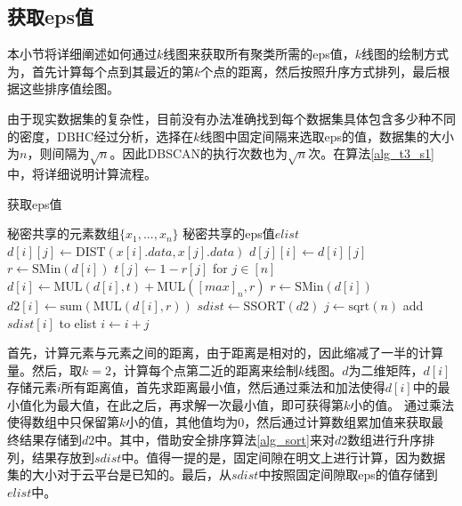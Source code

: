 \subsection{获取eps值}
本小节将详细阐述如何通过$ k $线图来获取所有聚类所需的eps值，$ k $线图的绘制方式为，首先计算每个点到其最近的第$ k $个点的距离，然后按照升序方式排列，最后根据这些排序值绘图。

由于现实数据集的复杂性，目前没有办法准确找到每个数据集具体包含多少种不同的密度，DBHC\cite{latifi2021dbhc}经过分析，选择在$ k $线图中固定间隔来选取eps的值，数据集的大小为$ n $，则间隔为$ \sqrt{n} $。因此DBSCAN的执行次数也为$ \sqrt{n} $次。在算法\ref{alg_t3_s1}中，将详细说明计算流程。

\begin{algorithm}[htbp]
	\renewcommand{\algorithmicrequire}{\textbf{输入:}}
	\renewcommand{\algorithmicensure}{\textbf{输出:}}
	\caption{获取eps值}
	\label{alg_t3_s1}
	\begin{algorithmic}[1]
		\REQUIRE 秘密共享的元素数组$ \{x_1,...,x_n\} $
		\ENSURE 秘密共享的eps值$ elist $
		\STATE $ d[i][j] \leftarrow \text{DIST}(x[i].data, x[j].data) $
		\STATE $ d[j][i] \leftarrow d[i][j] $
		\ENDFOR
		\ENDFOR
		\STATE $ r \leftarrow \text{SMin}(d[i]) $ %
		\STATE $ t[j] \leftarrow 1-r[j] $ for $ j\in[n] $
		\STATE $ d[i] \leftarrow \text{MUL}(d[i], t) + \text{MUL}([max]_n, r) $
		\STATE $ r \leftarrow \text{SMin}(d[i]) $
		\STATE $ d2[i] \leftarrow \text{sum}(\text{MUL}(d[i], r)) $ %
		\ENDFOR
		\STATE $ sdist \leftarrow \text{SSORT}(d2) $
		\STATE $ j \leftarrow \text{sqrt}(n) $
		\STATE add $ sdist[i] $ to elist
		\STATE $ i \leftarrow i + j $
		\ENDFOR
	\end{algorithmic}
\end{algorithm}

首先，计算元素与元素之间的距离，由于距离是相对的，因此缩减了一半的计算量。然后，取$ k=2 $，计算每个点第二近的距离来绘制$ k $线图。$ d $为二维矩阵，$ d[i] $存储元素$ i $所有距离值，首先求距离最小值，然后通过乘法和加法使得$ d[i] $中的最小值化为最大值，在此之后，再求解一次最小值，即可获得第$ k $小的值。
通过乘法使得数组中只保留第$ k $小的值，其他值均为0，然后通过计算数组累加值来获取最终结果存储到$ d2 $中。其中，借助安全排序算法\ref{alg_sort}来对$ d2 $数组进行升序排列，结果存放到$ sdist $中。值得一提的是，固定间隙在明文上进行计算，因为数据集的大小对于云平台是已知的。最后，从$ sdist $中按照固定间隙取eps的值存储到$ elist $中。


